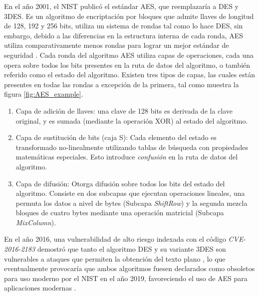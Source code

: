 En el año 2001, el NIST publicó el estándar AES, que reemplazaría a DES y 3DES. Es un algoritmo de encriptación por bloques que admite llaves de longitud de 128, 192 y 256 bits, utiliza un sistema de rondas tal como lo hace DES, sin embargo, debido a las diferencias en la estructura interna de cada ronda, AES utiliza comparativamente menos rondas para lograr un mejor estándar de seguridad \cite{paar-2011}. Cada ronda del algoritmo AES utiliza capas de operaciones, cada una opera sobre todos los bits presentes en la ruta de datos del algoritmo, o también referido como el estado del algoritmo. Existen tres tipos de capas, las cuales están presentes en todas las rondas a excepción de la primera, tal como muestra la figura \ref{fig:AES_example}. 
\begin{enumerate}
    \item Capa de adición de llaves: una clave de 128 bits es derivada de la clave original, y es sumada (mediante la operación XOR) al estado del algoritmo.
    \item Capa de sustitución de bits (caja S): Cada elemento del estado es transformado no-linealmente utilizando tablas de búsqueda con propiedades matemáticas especiales. Esto introduce \textit{confusión} en la ruta de datos del algoritmo.
    \item Capa de difusión: Otorga difusión sobre todos los bits del estado del algoritmo. Consiste en dos subcapas que ejecutan operaciones lineales, una permuta los datos a nivel de bytes (Subcapa \textit{ShiftRow}) y la segunda mezcla bloques de cuatro bytes mediante una operación matricial (Subcapa \textit{MixColumn}).  
\end{enumerate}

En el año 2016, una vulnerabilidad de alto riesgo indexada con el código \textit{CVE-2016-2183} demostró que tanto el algoritmo DES y su variante 3DES son vulnerables a ataques que permiten la obtención del texto plano \cite{cve2016-2183}, lo que eventualmente provocaría que ambos algoritmos fuesen declarados como obsoletos para uso moderno por el NIST en el año 2019, favoreciendo el uso de AES para aplicaciones modernas \cite{barker-2019}.

\pagebreak

